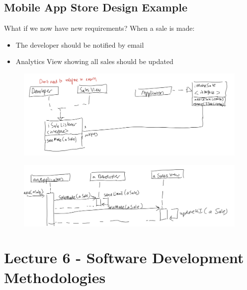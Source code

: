 \documentclass{article}
\begin{document}
\subsection{Mobile App Store Design Example}

What if we now have new requirements? When a sale is made:
\begin{itemize}
    \item The developer should be notified by email
    \item Analytics View showing all sales should be updated
\end{itemize}
\begin{figure}[H]
    \centering
    \includegraphics[width=0.8\linewidth]{Pictures/Screenshot 2023-02-08 at 11.55.08.png}
\end{figure}
\begin{figure}[H]
    \centering
\includegraphics[width=0.8\linewidth]{Pictures/Screenshot 2023-02-08 at 11.55.20.png}
\end{figure}
\section{Lecture 6 - Software Development Methodologies}
\end{document}
